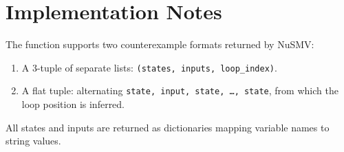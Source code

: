 \documentclass{article}
\begin{document}
\section*{Implementation Notes}

The function supports two counterexample formats returned by NuSMV:
\begin{enumerate}[label=(\alph*)]
  \item A 3-tuple of separate lists: \texttt{(states, inputs, loop\_index)}.
  \item A flat tuple: alternating \texttt{state, input, state, \ldots, state}, from
        which the loop position is inferred.
\end{enumerate}

All states and inputs are returned as dictionaries mapping variable names to
string values.
\end{document}
